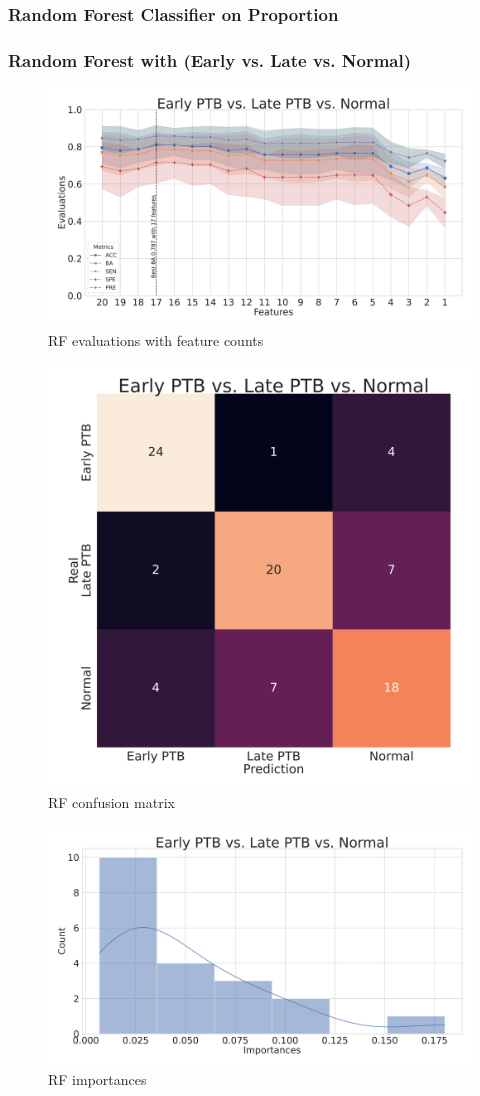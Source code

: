 \documentclass{beamer}
\begin{document}
    \subsubsection{Random Forest Classifier on Proportion}
    \begin{frame}[allowframebreaks]
        \frametitle{Random Forest with (Early vs. Late vs. Normal)}

        \begin{figure}
            \includegraphics[width=0.8 \linewidth]{figures/RandomForest_Proportion/RF.DADA2.homd.Mouth/metrics.pdf}
            \caption{RF evaluations with feature counts}
        \end{figure}

        \begin{figure}
            \includegraphics[width=0.5 \linewidth]{figures/RandomForest_Proportion/RF.DADA2.homd.Mouth/heatmap.pdf}
            \caption{RF confusion matrix}
        \end{figure}

        \begin{figure}
            \includegraphics[width=0.8 \linewidth]{figures/RandomForest_Proportion/RF.DADA2.homd.Mouth/importances.pdf}
            \caption{RF importances}
        \end{figure}


\end{frame}
\end{document}
